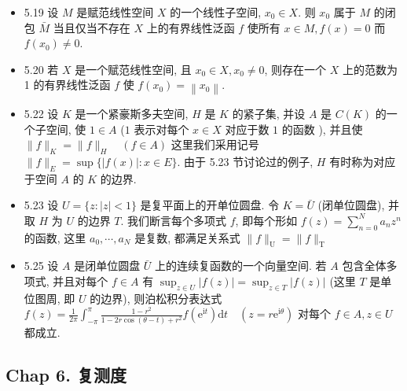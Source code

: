 \begin{itemize}
\item 5.19 设 $M$ 是赋范线性空间 $X$ 的一个线性子空间, $x_{0} \in X$. 则 $x_{0}$ 属于 $M$ 的闭包 $\bar{M}$ 当且仅当不存在 $X$ 上的有界线性泛函 $f$ 使所有 $x \in M, f(x)=0$ 而 $f\left(x_{0}\right) \neq 0$.

\item 5.20 若 $X$ 是一个赋范线性空间, 且 $x_{0} \in X, x_{0} \neq 0$, 则存在一个 $X$ 上的范数为 1 的有界线性泛函 $f$ 使 $f\left(x_{0}\right)=\left\|x_{0}\right\|$.

\item 5.22 设 $K$ 是一个紧豪斯多夫空间, $H$ 是 $K$ 的紧子集, 并设 $A$ 是 $C(K)$ 的一个子空间, 使 $1 \in A$ ($1$ 表示对每个 $x \in X$ 对应于数 $1$ 的函数 ), 并且使 $\|f\|_{K}=\|f\|_{H} \quad(f \in A)$ 这里我们采用记号 $\|f\|_{E}=\sup \{|f(x)|: x \in E\}$. 由于 5.23 节讨论过的例子, $H$ 有时称为对应于空间 $A$ 的 $K$ 的边界.

\item 5.23 设 $U=\{z:|z|<1\}$ 是复平面上的开单位圆盘. 令 $K=\bar{U}$ (闭单位圆盘), 并取 $H$ 为 $U$ 的边界 $T$. 我们断言每个多项式 $f$, 即每个形如 $f(z)=\sum_{n=0}^{N} a_{n} z^{n}$ 的函数, 这里 $a_{0}, \cdots, a_{N}$ 是复数, 都满足关系式 $\|f\|_{\mathrm{U}}=\|f\|_{\mathrm{T}}$

\item 5.25 设 $A$ 是闭单位圆盘 $\bar{U}$ 上的连续复函数的一个向量空间. 若 $A$ 包含全体多项式, 并且对每个 $f \in A$ 有 $\sup_{z \in U}|f(z)|=\sup _{z \in T} |f(z)|$ (这里 $T$ 是单位图周, 即 $U$ 的边界), 则泊松积分表达式 $f(z)=\frac{1}{2 \pi} \int_{-\pi}^{\pi} \frac{1-r^{2}}{1-2 r \cos (\theta-t)+r^{2}} f\left(\mathrm{e}^{\mathrm{i} t}\right) \mathrm{d} t \quad\left(z=r \mathrm{e}^{\mathrm{i} \theta}\right)$ 对每个 $f \in A, z \in U$ 都成立.

\end{itemize}


\subsection{Chap 6. 复测度}

